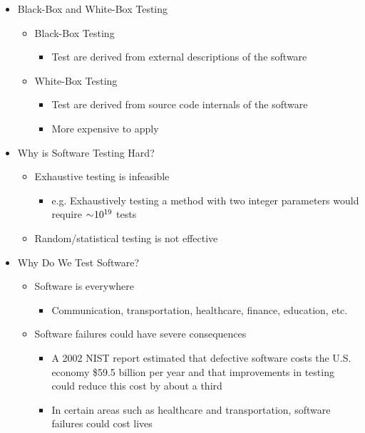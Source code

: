 \documentclass[11pt]{article}
\begin{document}
\begin{itemize}
	\item Black-Box and White-Box Testing
		\begin{itemize}
			\item Black-Box Testing
				\begin{itemize}
					\item Test are derived from external descriptions of the software
				\end{itemize}
			\item White-Box Testing
			\begin{itemize}
				\item Test are derived from source code internals of the software
				\item More expensive to apply
			\end{itemize}
		\end{itemize}

	\item Why is Software Testing Hard?
		\begin{itemize}
			\item Exhaustive testing is infeasible
				\begin{itemize}
					\item e.g. Exhaustively testing a method with two integer parameters would
					require $ \sim \negmedspace 10^{19} $ tests
				\end{itemize}
			\item Random/statistical testing is not effective
		\end{itemize}

	\item Why Do We Test Software?
		\begin{itemize}
			\item Software is everywhere
				\begin{itemize}
					\item Communication, transportation, healthcare, finance, education, etc.
				\end{itemize}
			\item Software failures could have severe consequences
				\begin{itemize}
					\item A 2002 NIST report estimated that defective software costs the U.S. economy \$59.5 billion per year and that improvements in testing could reduce this cost by about a third
					\item In certain areas such as healthcare and transportation, software failures could cost lives
				\end{itemize}
		\end{itemize}


\end{itemize}
\end{document}
